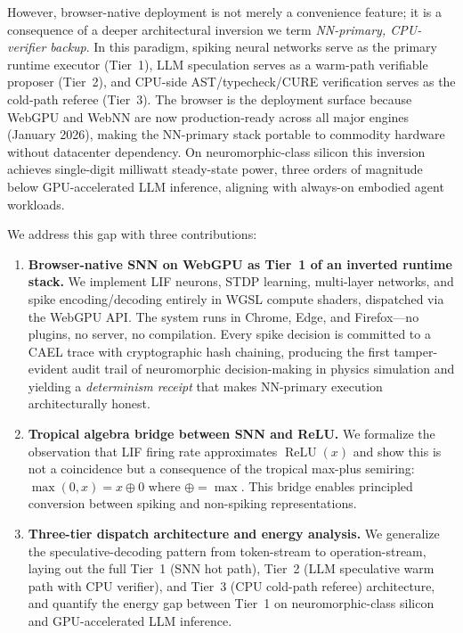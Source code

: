 \documentclass[10pt]{article}
\newcommand{\cael}{\textsc{CAEL}}
\newcommand{\relu}{\operatorname{ReLU}}
\newcommand{\tropplus}{\oplus}
\begin{document}
However, browser-native deployment is not merely a convenience feature; it is a
consequence of a deeper architectural inversion we term \emph{NN-primary,
CPU-verifier backup}. In this paradigm, spiking neural networks serve as the
primary runtime executor (Tier~1), LLM speculation serves as a warm-path
verifiable proposer (Tier~2), and CPU-side AST/typecheck/CURE verification
serves as the cold-path referee (Tier~3). The browser is the deployment
surface because WebGPU and WebNN are now production-ready across all major
engines (January 2026), making the NN-primary stack portable to commodity
hardware without datacenter dependency. On neuromorphic-class silicon this
inversion achieves single-digit milliwatt steady-state power, three orders of
magnitude below GPU-accelerated LLM inference, aligning with always-on embodied
agent workloads.

We address this gap with three contributions:

\begin{enumerate}
\item \textbf{Browser-native SNN on WebGPU as Tier~1 of an inverted runtime stack.}
We implement LIF neurons, STDP learning, multi-layer networks, and spike encoding/decoding
entirely in WGSL compute shaders, dispatched via the WebGPU API.
The system runs in Chrome, Edge, and Firefox---no plugins, no server, no compilation.
Every spike decision is committed to a \cael{} trace with cryptographic hash chaining,
producing the first tamper-evident audit trail of neuromorphic decision-making in
physics simulation and yielding a \emph{determinism receipt} that makes NN-primary
execution architecturally honest.

\item \textbf{Tropical algebra bridge between SNN and ReLU.}
We formalize the observation that LIF firing rate approximates $\relu(x)$ and show this
is not a coincidence but a consequence of the tropical max-plus semiring:
$\max(0, x) = x \tropplus 0$ where $\tropplus = \max$.
This bridge enables principled conversion between spiking and non-spiking representations.

\item \textbf{Three-tier dispatch architecture and energy analysis.}
We generalize the speculative-decoding pattern from token-stream to operation-stream,
laying out the full Tier~1 (SNN hot path), Tier~2 (LLM speculative warm path with
CPU verifier), and Tier~3 (CPU cold-path referee) architecture, and quantify the
energy gap between Tier~1 on neuromorphic-class silicon and GPU-accelerated LLM
inference.
\end{enumerate}
\end{document}
